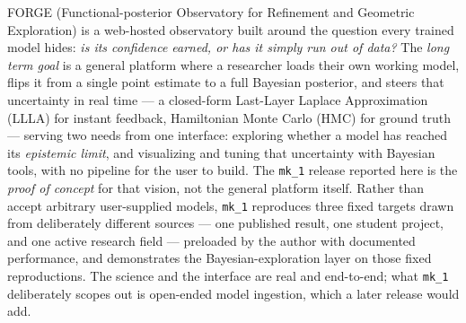 
\begingroup
\renewcommand{\contentsname}{Contents}
\tableofcontents
\endgroup

\clearpage

\preparedby

FORGE (Functional-posterior Observatory for Refinement and Geometric Exploration) is a web-hosted observatory built around the question every trained model hides: \emph{is its confidence earned, or has it simply run out of data?} The \emph{long term goal} is a general platform where a researcher loads their own working model, flips it from a single point estimate to a full Bayesian posterior, and steers that uncertainty in real time --- a closed-form Last-Layer Laplace Approximation (LLLA) for instant feedback, Hamiltonian Monte Carlo (HMC) for ground truth --- serving two needs from one interface: exploring whether a model has reached its \emph{epistemic limit}, and visualizing and tuning that uncertainty with Bayesian tools, with no pipeline for the user to build. The \mbox{\texttt{mk\_1}} release reported here is the \emph{proof of concept} for that vision, not the general platform itself. Rather than accept arbitrary user-supplied models, \mbox{\texttt{mk\_1}} reproduces three fixed targets drawn from deliberately different sources --- one published result, one student project, and one active research field --- preloaded by the author with documented performance, and demonstrates the Bayesian-exploration layer on those fixed reproductions. The science and the interface are real and end-to-end; what \mbox{\texttt{mk\_1}} deliberately scopes out is open-ended model ingestion, which a later release would add.

